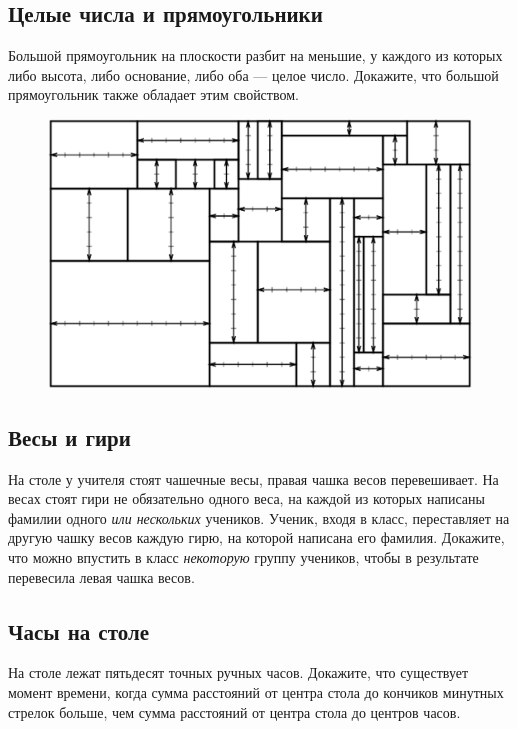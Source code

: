\subsection*{Целые числа и прямоугольники} %

Большой прямоугольник на плоскости разбит на меньшие, у каждого из которых либо высота, либо основание, либо оба --- целое число. 
Докажите, что большой прямоугольник также обладает этим свойством.

\begin{figure}[h!]
\centering
\includegraphics[scale=0.5]{Figs/Insight/rect}
\end{figure}

\subsection*{Весы и гири} %

На столе у учителя стоят чашечные весы, правая чашка весов перевешивает.
На весах стоят гири не обязательно одного веса, на каждой из которых написаны фамилии одного \emph{или нескольких} учеников.
Ученик, входя в класс, переставляет на другую чашку весов каждую гирю, на которой написана его фамилия.
Докажите, что можно впустить в класс \emph{некоторую} группу учеников, чтобы в результате перевесила левая чашка весов.

\subsection*{Часы на столе} %

На столе лежат пятьдесят точных ручных часов.
Докажите, что существует момент времени, когда сумма расстояний от центра стола до кончиков минутных стрелок больше, чем сумма расстояний от центра стола до центров часов.

